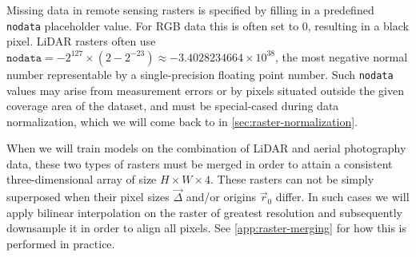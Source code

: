 Missing data in remote sensing rasters is specified by filling in a predefined \texttt{nodata} placeholder value.
For RGB data this is often set to $0$, resulting in a black pixel.
LiDAR rasters often use $\texttt{nodata} = -2^{127} \times (2 - 2^{-23}) \approx -3.4028234664 \times 10^{38}$, the most negative normal number representable by a single-precision floating point number.
Such \texttt{nodata} values may arise from measurement errors or by pixels situated outside the given coverage area of the dataset, and must be special-cased during data normalization, which we will come back to in \cref{sec:raster-normalization}.

When we will train models on the combination of LiDAR and aerial photography data, these two types of rasters must be merged in order to attain a consistent three-dimensional array of size $H \times W \times 4$.
These rasters can not be simply superposed when their pixel sizes $\vec{\Delta}$ and/or origins $\vec{r}_0$ differ.
In such cases we will apply bilinear interpolation on the raster of greatest resolution and subsequently downsample it in order to align all pixels.
See \cref{app:raster-merging} for how this is performed in practice.
